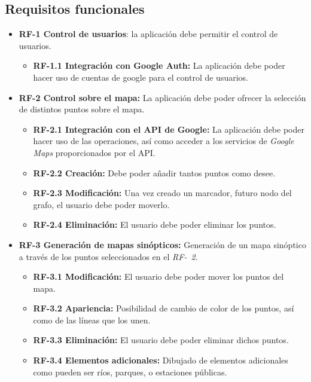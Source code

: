 \subsection{Requisitos funcionales}
\begin{itemize}
	\item \textbf{RF-1 Control de usuarios}: la aplicación debe permitir el control de usuarios.
	\begin{itemize}
		\item \textbf{RF-1.1 Integración con Google Auth:} La aplicación debe poder hacer uso de cuentas de google para el control de usuarios.
	\end{itemize}
	\item \textbf{RF-2 Control sobre el mapa:} La aplicación debe poder ofrecer la selección de distintos puntos sobre el mapa.
	\begin{itemize}
		\item \textbf{RF-2.1 Integración con el API de Google:} La aplicación debe poder hacer uso de las operaciones, así como acceder a los servicios de \textit{Google Maps} proporcionados por el API.
		\item \textbf{RF-2.2 Creación:} Debe poder añadir tantos puntos como desee.
		\item \textbf{RF-2.3 Modificación:} Una vez creado un marcador, futuro nodo del grafo, el usuario debe poder moverlo.
		\item \textbf{RF-2.4 Eliminación:} El usuario debe poder eliminar los puntos.
	\end{itemize}
	\item \textbf{RF-3 Generación de mapas sinópticos:} Generación de un mapa sinóptico a través de los puntos seleccionados en el \textit{RF-~2}.
	\begin{itemize}
		\item \textbf{RF-3.1 Modificación:} El usuario debe poder mover los puntos del mapa.
		\item \textbf{RF-3.2 Apariencia:} Posibilidad de cambio de color de los puntos, así como de las líneas que los unen.
		\item \textbf{RF-3.3 Eliminación:} El usuario debe poder eliminar dichos puntos.
		\item \textbf{RF-3.4 Elementos adicionales:} Dibujado de elementos adicionales como pueden ser ríos, parques, o estaciones públicas.
	\end{itemize}
\end{itemize}


